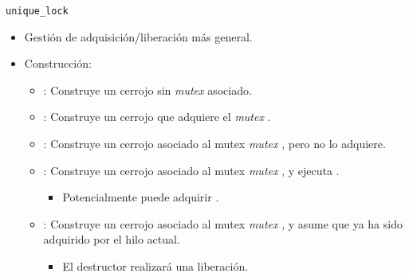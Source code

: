 \begin{frame}{\texttt{unique\_lock}}
\begin{itemize}
  \item Gestión de adquisición/liberación más general.
  \item Construcción:
    \begin{itemize}
      \item {}: Construye un cerrojo sin \emph{mutex} asociado.
      \item {}: Construye un cerrojo que adquiere el \emph{mutex} .
      \item {}: Construye un cerrojo asociado al mutex \emph{mutex} , pero no lo adquiere.
      \item {}: Construye un cerrojo asociado al mutex \emph{mutex} , y ejecuta .
        \begin{itemize}
          \item Potencialmente puede adquirir .
        \end{itemize}
      \item {}: Construye un cerrojo asociado al mutex \emph{mutex} , y asume que ya ha sido adquirido por el hilo actual.
        \begin{itemize}
          \item El destructor realizará una liberación.
        \end{itemize}
    \end{itemize}
\end{itemize}
\end{frame}

